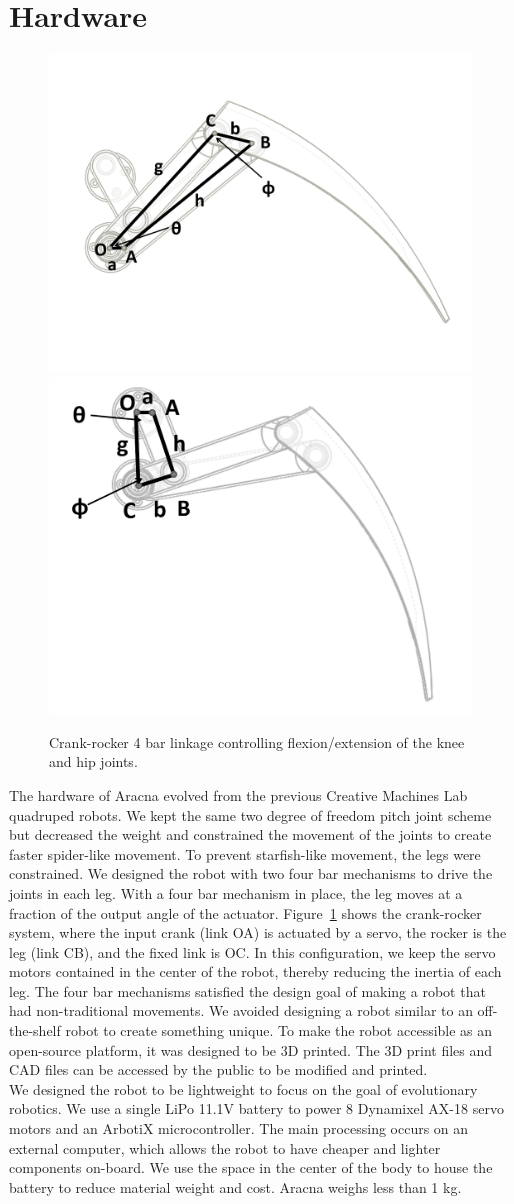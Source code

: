 \documentclass[letterpaper]{article}
\begin{document}
\section{Hardware}

\begin{figure}[t]
\begin{center}
\includegraphics[width=.23\textwidth]{fig3.pdf}
\includegraphics[width=.23\textwidth]{fig4.pdf}
\caption{Crank-rocker 4 bar linkage controlling flexion/extension of
  the knee and hip joints.}
\label{fig3}
\end{center}
\end{figure}


The hardware of Aracna evolved from the previous Creative Machines
Lab quadruped robots. We kept the same two degree of freedom pitch
joint scheme but decreased the weight and constrained the movement of
the joints to create faster spider-like movement. To prevent
starfish-like movement, the legs were constrained. We designed the
robot with two four bar mechanisms to drive the joints in each
leg. With a four bar mechanism in place, the leg moves at a fraction
of the output angle of the actuator. Figure~\ref{fig3} shows the
crank-rocker system, where the input crank (link OA) is actuated by a
servo, the rocker is the leg (link CB), and the fixed link is OC. In
this configuration, we keep the servo motors contained in the center
of the robot, thereby reducing the inertia of each leg. The four bar
mechanisms satisfied the design goal of making a robot that had
non-traditional movements. We avoided designing a robot similar to an
off-the-shelf robot to create something unique. To make the robot
accessible as an open-source platform, it was designed to be 3D
printed. The 3D print files and CAD files can be accessed by the
public to be modified and printed.  \\ We designed the robot to be
lightweight to focus on the goal of evolutionary robotics. We use a
single LiPo 11.1V battery to power 8 Dynamixel AX-18 servo motors and
an ArbotiX microcontroller. The main processing occurs on an external
computer, which allows the robot to have cheaper and lighter
components on-board. We use the space in the center of the body to
house the battery to reduce material weight and cost. Aracna weighs
less than 1 kg.
\end{document}
